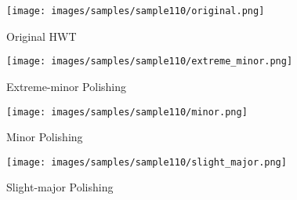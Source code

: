 \begin{figure*}[htbp]
    \centering
    \begin{minipage}{\textwidth} %
        \centering
        \begin{subfigure}{0.7\textwidth}
            \centering
            \texttt{[image: images/samples/sample110/original.png]}
            \caption{Original HWT}
        \end{subfigure}
    \end{minipage}

    \vspace{0.5cm} %
    \begin{minipage}{\textwidth} %
        \centering
        \begin{subfigure}{0.7\textwidth}
            \centering
            \texttt{[image: images/samples/sample110/extreme\_minor.png]}
            \caption{Extreme-minor Polishing}
        \end{subfigure}
    \end{minipage}

    \vspace{0.5cm} %
    \begin{minipage}{\textwidth} %
        \centering
        \begin{subfigure}{0.7\textwidth}
            \centering
            \texttt{[image: images/samples/sample110/minor.png]}
            \caption{Minor Polishing}
        \end{subfigure}
    \end{minipage}

    \vspace{0.5cm} %
    \begin{minipage}{\textwidth} %
        \centering
        \begin{subfigure}{0.7\textwidth}
            \centering
            \texttt{[image: images/samples/sample110/slight\_major.png]}
            \caption{Slight-major Polishing}
        \end{subfigure}
    \end{minipage}


\end{figure*}
